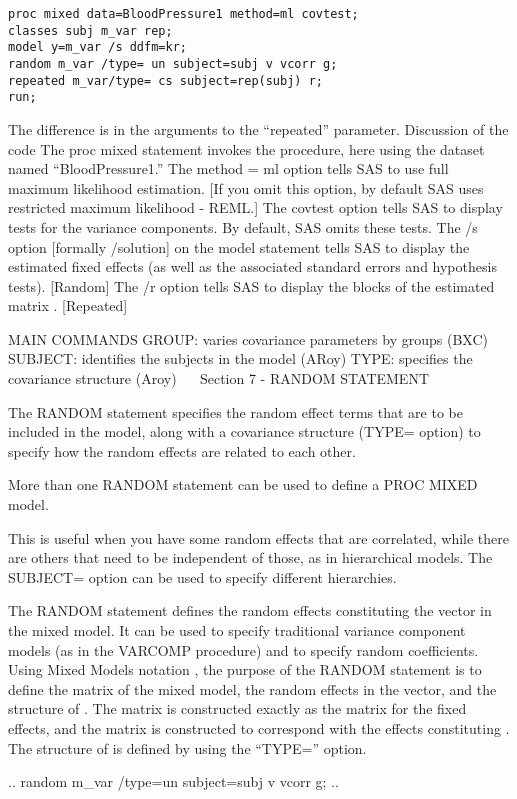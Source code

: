 \begin{verbatim}
proc mixed data=BloodPressure1 method=ml covtest;
classes subj m_var rep;
model y=m_var /s ddfm=kr;
random m_var /type= un subject=subj v vcorr g;
repeated m_var/type= cs subject=rep(subj) r;
run;
\end{verbatim}
The difference is in the arguments to the “repeated” parameter.
Discussion of the code
The proc mixed statement invokes the procedure, here using the dataset named “BloodPressure1.”
The method = ml option tells SAS to use full maximum likelihood estimation. [If you omit this option, by default SAS uses restricted maximum likelihood - REML.]
The covtest option tells SAS to display tests for the variance components.  By default, SAS omits these tests.
The /s option [formally /solution] on the model statement tells SAS to display the estimated fixed effects (as well as the associated standard errors and hypothesis tests). [Random]
The /r option tells SAS to display the blocks of the estimated  matrix . [Repeated]

MAIN COMMANDS
GROUP:		 varies covariance parameters by groups  	(BXC)
 SUBJECT:	 identifies the subjects in the model 		(ARoy)
 TYPE: 		 specifies the covariance structure 		(Aroy)
 
Section 7 - RANDOM STATEMENT

The RANDOM statement specifies the random effect terms that are to be included in the model, along with a
covariance structure (TYPE= option) to specify how the random effects are related to each other. 

More than one RANDOM statement can be used to define a PROC MIXED model. 

This is useful when you have some random effects that are correlated, while there are others that need to be independent of those, as in hierarchical models. The SUBJECT= option can be used to specify different hierarchies.

The RANDOM statement defines the random effects constituting the   vector in the mixed model. 
It can be used to specify traditional variance component models (as in the VARCOMP procedure) and to specify random coefficients.
Using Mixed Models notation , the purpose of the RANDOM statement is to define the   matrix of the mixed model, the random effects in the  vector, and the structure of  . 
The  matrix is constructed exactly as the  matrix for the fixed effects, and the  matrix is constructed to correspond with the effects constituting  . 
The structure of  is defined by using the “TYPE=” option. 

..
random m_var /type=un subject=subj v vcorr g;
..

